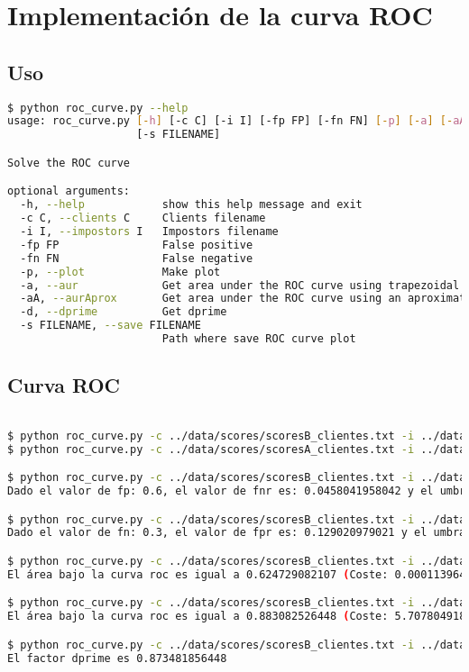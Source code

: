 \section{Implementación de la curva ROC}

\subsection{Uso}

\begin{lstlisting}[language=bash,label=pip,caption=Instalación de un paquete utilizando pip]
$ python roc_curve.py --help
usage: roc_curve.py [-h] [-c C] [-i I] [-fp FP] [-fn FN] [-p] [-a] [-aA] [-d]
                    [-s FILENAME]

Solve the ROC curve

optional arguments:
  -h, --help            show this help message and exit
  -c C, --clients C     Clients filename
  -i I, --impostors I   Impostors filename
  -fp FP                False positive
  -fn FN                False negative
  -p, --plot            Make plot
  -a, --aur             Get area under the ROC curve using trapezoidal rule
  -aA, --aurAprox       Get area under the ROC curve using an aproximation
  -d, --dprime          Get dprime
  -s FILENAME, --save FILENAME
                        Path where save ROC curve plot
\end{lstlisting}

\subsection{Curva ROC}
\begin{lstlisting}[language=bash,label=pip,caption=Instalación de un paquete utilizando pip]

$ python roc_curve.py -c ../data/scores/scoresB_clientes.txt -i ../data/scores/scoresB_impostores.txt  -s scoresB
$ python roc_curve.py -c ../data/scores/scoresA_clientes.txt -i ../data/scores/scoresA_impostores.txt  -s scoresA

$ python roc_curve.py -c ../data/scores/scoresB_clientes.txt -i ../data/scores/scoresB_impostores.txt  -fp 0.6   
Dado el valor de fp: 0.6, el valor de fnr es: 0.0458041958042 y el umbral: 0.00434 

$ python roc_curve.py -c ../data/scores/scoresB_clientes.txt -i ../data/scores/scoresB_impostores.txt  -fn 0.3 -p
Dado el valor de fn: 0.3, el valor de fpr es: 0.129020979021 y el umbral: 0.079034 

$ python roc_curve.py -c ../data/scores/scoresB_clientes.txt -i ../data/scores/scoresB_impostores.txt  -a       
El área bajo la curva roc es igual a 0.624729082107 (Coste: 0.000113964080811)

$ python roc_curve.py -c ../data/scores/scoresB_clientes.txt -i ../data/scores/scoresB_impostores.txt  -aA
El área bajo la curva roc es igual a 0.883082526448 (Coste: 5.70780491829)

$ python roc_curve.py -c ../data/scores/scoresB_clientes.txt -i ../data/scores/scoresB_impostores.txt  -d -s dprime
El factor dprime es 0.873481856448
\end{lstlisting}